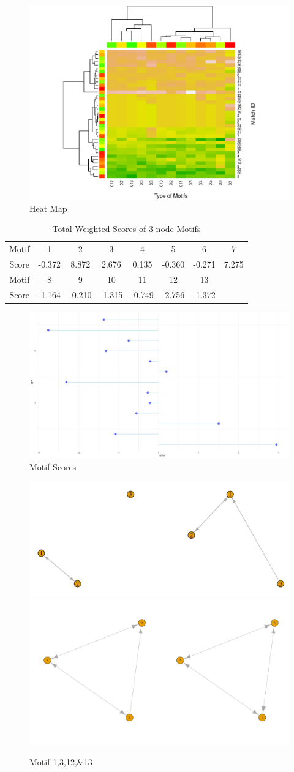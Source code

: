 \documentclass{mcmthesis}
\begin{document}
\begin{figure}[h!]
\begin{center}
\includegraphics[width=.6\textwidth]{F4.pdf}
\caption{Heat Map}
\end{center}
\end{figure}

\begin{table}[thb]
\caption{Total Weighted Scores of 3-node Motifs}
\begin{center}
\begin{tabular}{ c c c c c c c c}
\hline
Motif & 1&2&3&4&5&6&7\\
Score &-0.372& 8.872&2.676&0.135&-0.360&-0.271&7.275\\
\hline
Motif &8&9&10&11&12&13\\
Score &-1.164&-0.210&-1.315&-0.749&-2.756&-1.372\\
\hline
\end{tabular}
\end{center}
\end{table}

 \begin{figure}[h!]
\begin{center}
\includegraphics[width=.45\textwidth]{F5.pdf}
\caption{Motif Scores}
\end{center}
\end{figure}

\begin{figure}[h!]
\begin{center}
\includegraphics[width=.4\textwidth]{F6_1f.pdf}\includegraphics[width=.4\textwidth]{F62.pdf}
\caption{Motif 1,3,12,\&13}
\end{center}
\end{figure}
\end{document}
